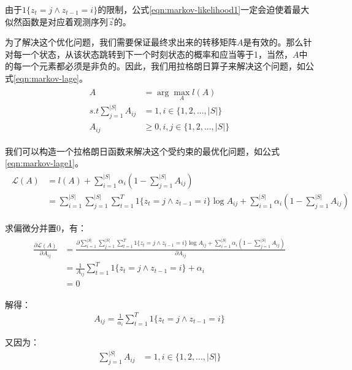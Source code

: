 由于$1\{z_t=j \wedge z_{t-1}=i\}$的限制，公式\ref{eqn:markov-likelihood1}一定会迫使着最大似然函数是对应着观测序列$\vec{z}$的。

为了解决这个优化问题，我们需要保证最终求出来的转移矩阵$A$是有效的。那么针对每一个状态，从该状态跳转到下一个时刻状态的概率和应当等于1，当然，$A$中的每一个元素都必须是非负的。因此，我们用拉格朗日算子来解决这个问题，如公式\ref{eqn:markov-lage}。
\begin{align}
\label{eqn:markov-lage}
\begin{split}
    A &= \arg\mathop{\max}_{A}l(A)\\
s.t \sum_{j=1}^{|S|} A_{ij} &=1, i\in\{1,2,...,|S|\} \\
    A_{ij} &\geq 0, i,j \in  \{1,2,...,|S|\}
\end{split}
\end{align}

我们可以构造一个拉格朗日函数来解决这个受约束的最优化问题，如公式\ref{eqn:markov-lage1}。
\begin{align}
\label{eqn:markov-lage1}
\begin{split}
    \mathcal{L}(A) &= l(A) + \sum_{i=1}^{|S|} \alpha_{i}(1-\sum_{j=1}^{|S|} A_{ij}) \\
                   &= \sum_{i=1}^{|S|} \sum_{j=1}^{|S|} \sum_{t=1}^{T} 1\{z_t=j \wedge z_{t-1}=i\} \log A_{ij} + \sum_{i=1}^{|S|} \alpha_{i}(1-\sum_{j=1}^{|S|} A_{ij}) 
\end{split}
\end{align}

求偏微分并置0，有：
\begin{align}
\label{eqn:markov-grad}
\begin{split}
    \frac{\partial \mathcal{L}(A)}{\partial A_{ij}}
          &=  \frac{\partial \sum_{i=1}^{|S|} \sum_{j=1}^{|S|} \sum_{t=1}^{T} 1\{z_t=j \wedge z_{t-1}=i\} \log A_{ij} + \sum_{i=1}^{|S|} \alpha_{i}(1-\sum_{j=1}^{|S|} A_{ij})}{\partial A_{ij}} \\
          &= \frac{1}{A_{ij}} \sum_{t=1}^{T} 1\{z_t=j \wedge z_{t-1}=i\} + \alpha_i \\
          &= 0
\end{split}
\end{align}

解得：
\begin{align}
\label{eqn:markov-grad1}
   A_{ij} = \frac{1}{\alpha_i}\sum_{t=1}^{T} 1\{z_t=j \wedge z_{t-1}=i\}
\end{align}

又因为：
\begin{align}
  \sum_{j=1}^{|S|} A_{ij} &=1, i\in\{1,2,...,|S|\} \\
\end{align}

